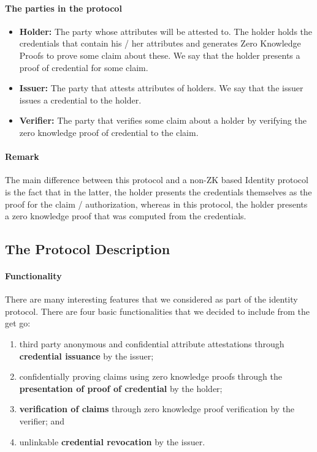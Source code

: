\paragraph[:]{The parties in the protocol}
\begin{itemize}
\item \textbf{Holder:} The party whose attributes will be attested to. 
The holder holds the credentials that contain his / her attributes and generates Zero Knowledge Proofs to prove some claim about these. 
We say that the holder presents a proof of credential for some claim.

\item \textbf{Issuer:} The party that attests attributes of holders. We say that the issuer issues a credential to the holder.

\item \textbf{Verifier:} The party that verifies some claim about a holder by verifying the zero knowledge proof of credential to the claim.
\end{itemize}

\paragraph{Remark} The main difference between this protocol and a non-ZK based Identity protocol is the fact that in the latter, the holder presents the credentials themselves as the proof for the claim / authorization, whereas in this protocol, the holder presents a zero knowledge proof that was computed from the credentials.


\vspace{-.5em} %
\subsection{The Protocol Description}
\label{sec:apps:id-framework:protocol-description}


\vspace{-.5em} %
\paragraph{Functionality}
There are many interesting features that we considered as part of the identity protocol. 
There are four basic functionalities that we decided to include from the get go: 
\begin{enumerate}
\item third party anonymous and confidential attribute attestations through \textbf{credential issuance} by the issuer;
\item confidentially proving claims using zero knowledge proofs through the \textbf{presentation of proof of credential} by the holder;
\item \textbf{verification of claims} through zero knowledge proof verification by the verifier; and
\item unlinkable \textbf{credential revocation} by the issuer. 
\end{enumerate}


